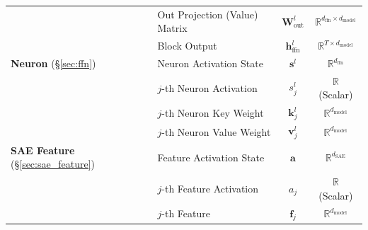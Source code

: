 \begin{table}[!t]
\begin{tabular}{l l c c}
    & Out Projection (Value) Matrix & $\mathbf{W}_{\text{out}}^l$ & $\mathbb{R}^{d_\text{ffn} \times d_{\text{model}}}$ \\
    & Block Output & $\mathbf{h}_\text{ffn}^{l}$ & $\mathbb{R}^{T \times d_{\text{model}}}$ \\
    \addlinespace[2pt] \hdashline[1pt/1pt] \addlinespace[2pt]
    \textbf{Neuron} (\S\ref{sec:ffn})
    & Neuron Activation State & $\mathbf{s}^l$ & $\mathbb{R}^{d_\text{ffn}}$ \\
    & $j$-th Neuron Activation & ${s}^l_j$ & $\mathbb{R}$ (Scalar) \\
    & $j$-th Neuron Key Weight & $\mathbf{k}_{j}^l$ & $\mathbb{R}^{d_{\text{model}}}$ \\
    & $j$-th Neuron Value Weight & $\mathbf{v}_{j}^l$ & $\mathbb{R}^{d_{\text{model}}}$ \\
    \addlinespace[2pt] \hdashline[1pt/1pt] \addlinespace[2pt]
    \textbf{SAE Feature} (\S\ref{sec:sae_feature}) & Feature Activation State& $\mathbf{a}$ & $\mathbb{R}^{d_{\text{SAE}}}$ \\
    & $j$-th Feature Activation & $a_j$ & $\mathbb{R}$ (Scalar) \\
    & $j$-th Feature & $\mathbf{f}_j$ & $\mathbb{R}^{d_{\text{model}}}$ \\
    \bottomrule[1.3pt]
    \end{tabular}
    \end{table}